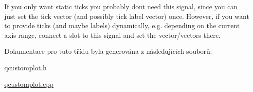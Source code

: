 If you only want static ticks you probably don\textquotesingle{}t need this signal, since you can just set the tick vector (and possibly tick label vector) once. However, if you want to provide ticks (and maybe labels) dynamically, e.\+g. depending on the current axis range, connect a slot to this signal and set the vector/vectors there. 

Dokumentace pro tuto třídu byla generována z následujících souborů\+:\begin{DoxyCompactItemize}
\item 
\hyperlink{qcustomplot_8h}{qcustomplot.\+h}\item 
\hyperlink{qcustomplot_8cpp}{qcustomplot.\+cpp}\end{DoxyCompactItemize}

